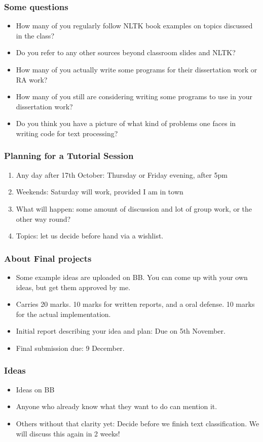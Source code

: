 \documentclass{beamer}
\begin{document}
\begin{frame}
\frametitle{Some questions}
\begin{itemize}
\item How many of you regularly follow NLTK book examples on topics discussed in the class? \pause
\item Do you refer to any other sources beyond classroom slides and NLTK? \pause
\item How many of you actually write some programs for their dissertation work or RA work? \pause
\item How many of you still are considering writing some programs to use in your dissertation work? \pause
\item Do you think you have a picture of what kind of problems one faces in writing code for text processing? \pause
\end{itemize}
\end{frame}

\begin{frame}
\frametitle{Planning for a Tutorial Session}
\begin{enumerate}
\item Any day after 17th October: Thursday or Friday evening, after 5pm
\item Weekends: Saturday will work, provided I am in town
\item What will happen: some amount of discussion and lot of group work, or the other way round?
\item Topics: let us decide before hand via a wishlist. 
\end{enumerate}
\end{frame}

\begin{frame}
\frametitle{About Final projects}
\begin{itemize}
\item Some example ideas are uploaded on BB. You can come up with your own ideas, but get them approved by me.
\item Carries 20 marks. 10 marks for written reports, and a oral defense. 10 marks for the actual implementation.
\item Initial report describing your idea and plan: Due on 5th November.
\item Final submission due: 9 December. 
\end{itemize}
\end{frame}

\begin{frame}
\frametitle{Ideas}
\begin{itemize}
\item Ideas on BB
\item Anyone who already know what they want to do can mention it.
\item Others without that clarity yet: Decide before we finish text classification. We will discuss this again in 2 weeks!
\end{itemize}
\end{frame}
\end{document}
